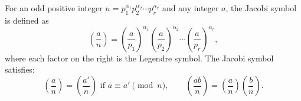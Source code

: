 For an odd positive integer $n = p_1^{\alpha_1} p_2^{\alpha_2} \cdots p_r^{\alpha_r}$ and any integer $a$, the Jacobi symbol is defined as
$$\left(\frac{a}{n}\right) = \left(\frac{a}{p_1}\right)^{\alpha_1} \left(\frac{a}{p_2}\right)^{\alpha_2} \cdots \left(\frac{a}{p_r}\right)^{\alpha_r},$$
where each factor on the right is the Legendre symbol. The Jacobi symbol satisfies:
$$\left(\frac{a}{n}\right) = \left(\frac{a'}{n}\right) \text{ if } a \equiv a' \pmod{n}, \qquad
\left(\frac{ab}{n}\right) = \left(\frac{a}{n}\right)\left(\frac{b}{n}\right).$$
